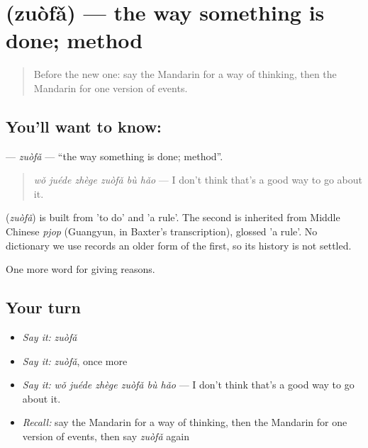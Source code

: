 \section[\texorpdfstring{\zh{做法} (zuòfǎ)}{做法 (zuòfǎ)}]{ (zuòfǎ) — the way something is done; method}

\label{lesson:ZH-C349-zuofa}



\begin{quote}
Before the new one: say the Mandarin for a way of thinking, then the Mandarin for one version of events.
\end{quote}

\subsection*{You'll want to know: }
\textbf{} — \emph{zuòfǎ} — \textquotedblleft{}the way something is done; method\textquotedblright{}.

\begin{quote}
\textbf{} \emph{wǒ juéde zhège zuòfǎ bù hǎo} — I don't think that's a good way to go about it.
\end{quote}

\begin{cousinweb}
\textbf{} (\emph{zuòfǎ}) is built from  'to do' and  'a rule'. The second is inherited from Middle Chinese \emph{pjop} (Guangyun, in Baxter's transcription), glossed 'a rule'. No dictionary we use records an older form of the first, so its history is not settled.
\end{cousinweb}

\begin{grammarlens}[title={What you've built}]
One more word for giving reasons.
\end{grammarlens}

\subsection*{Your turn}
\begin{itemize}
\raggedright
  \item \emph{Say it:} \emph{zuòfǎ}
  \item \emph{Say it:} \emph{zuòfǎ}, once more
  \item \emph{Say it:} \emph{wǒ juéde zhège zuòfǎ bù hǎo} — I don't think that's a good way to go about it.
  \item \emph{Recall:} say the Mandarin for a way of thinking, then the Mandarin for one version of events, then say \emph{zuòfǎ} again
\end{itemize}

